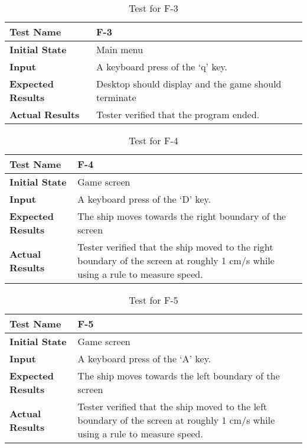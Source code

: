 \documentclass[12pt, titlepage]{article}
\begin{document}
\begin{table}[!htbp]
\begin{tabular}[r]{|l|l|}\hline
\textbf{Test Name} & F-3 \\ \hline
\textbf{Initial State} &   Main menu \\ \hline
\textbf{Input} &A keyboard press of the `q' key. \\ \hline 
\textbf{Expected Results} &Desktop should display and the game should terminate \\ \hline
\textbf{Actual Results} & Tester verified that the program ended.\\ \hline            
\end{tabular}
\caption{Test for F-3}
\label{Table}
\end{table}

\begin{table}[!htbp]
\begin{tabular}[r]{|l|l|}\hline
\textbf{Test Name} & F-4 \\ \hline
\textbf{Initial State} &   Game screen\\ \hline
\textbf{Input} &A keyboard press of the `D' key. \\ \hline 
\textbf{Expected Results} &The ship moves towards the right boundary of the screen \\ \hline
\textbf{Actual Results} & Tester verified that the ship moved to the right boundary of the screen at roughly 1 cm/s while using a rule to measure speed.\\ \hline            
\end{tabular}
\caption{Test for F-4}
\label{Table}
\end{table}

\begin{table}[!htbp]
\begin{tabular}[r]{|l|l|}\hline
\textbf{Test Name} & F-5 \\ \hline
\textbf{Initial State} &   Game screen\\ \hline
\textbf{Input} &A keyboard press of the `A' key. \\ \hline 
\textbf{Expected Results} &The ship moves towards the left boundary of the screen \\ \hline
\textbf{Actual Results} & Tester verified that the ship moved to the left boundary of the screen at roughly 1 cm/s while using a rule to measure speed.\\ \hline            
\end{tabular}
\caption{Test for F-5}
\label{Table}
\end{table}
\end{document}
